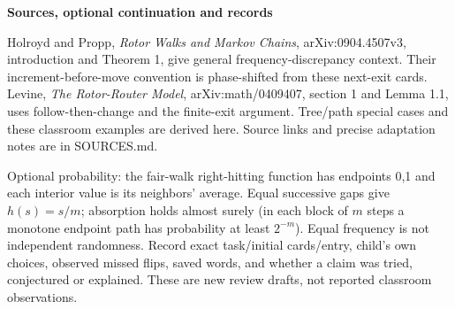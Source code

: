 \documentclass[11pt]{article}
\newcommand{\prob}[1]{\vspace{3pt}\textbf{#1}\par}
\begin{document}
\prob{Sources, optional continuation and records}
Holroyd and Propp, \emph{Rotor Walks and Markov Chains}, arXiv:0904.4507v3, introduction and Theorem 1, give general frequency-discrepancy context. Their increment-before-move convention is phase-shifted from these next-exit cards. Levine, \emph{The Rotor-Router Model}, arXiv:math/0409407, section 1 and Lemma 1.1, uses follow-then-change and the finite-exit argument. Tree/path special cases and these classroom examples are derived here. Source links and precise adaptation notes are in SOURCES.md.

Optional probability: the fair-walk right-hitting function has endpoints 0,1 and each interior value is its neighbors' average. Equal successive gaps give $h(s)=s/m$; absorption holds almost surely (in each block of $m$ steps a monotone endpoint path has probability at least $2^{-m}$). Equal frequency is not independent randomness. Record exact task/initial cards/entry, child's own choices, observed missed flips, saved words, and whether a claim was tried, conjectured or explained. These are new review drafts, not reported classroom observations.
\end{document}
